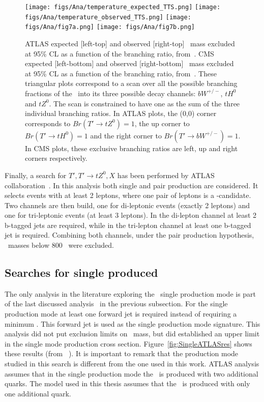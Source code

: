 \begin{figure}[!Hhtbp]
  \begin{center}
    \texttt{[image: figs/Ana/temperature\_expected\_TTS.png]}
    \texttt{[image: figs/Ana/temperature\_observed\_TTS.png]}
    \texttt{[image: figs/Ana/fig7a.png]}
    \texttt{[image: figs/Ana/fig7b.png]}
    \caption{ATLAS expected [left-top] and observed [right-top] \Tp~mass excluded at 95\% CL as a function of the branching ratio, from~\cite{Aad:2015gdg}. CMS expected [left-bottom] and observed [right-bottom] \Tp~mass excluded at 95\% CL as a function of the branching ratio, from~\cite{Chatrchyan:2013uxa}. These triangular plots correspond to a scan over all the possible branching fractions of the \Tp~into its three possible decay channels: $bW^{+/-}$, $tH^{0}$ and $tZ^{0}$. The scan is constrained to have one as the sum of the three individual branching ratios. In ATLAS plots, the (0,0) corner corresponds to ${Br(T'\rightarrow tZ^{0})=1}$, the up corner to ${Br(T'\rightarrow tH^{0})=1}$ and the right corner to ${Br(T'\rightarrow bW^{+/-})=1}$. In CMS plots, these exclusive branching ratios are left, up and right corners respectively.}
    \label{fig:ATLASCMSres}
  \end{center}
\end{figure}

Finally, a search for ${T',T'\rightarrow tZ^{0},X}$ has been performed by ATLAS collaboration~\cite{Aad:2014efa}. In this analysis both single and pair production are considered. It selects events with at least 2 leptons, where one pair of leptons is a \Z-candidate. Two channels are then build, one for di-leptonic events (exactly 2 leptons) and one for tri-leptonic events (at least 3 leptons). In the di-lepton channel at least 2 b-tagged jets are required, while in the tri-lepton channel at least one b-tagged jet is required. Combining both channels, under the pair production hypothesis, \Tp~masses below 800 \GeVcc~were excluded.

\subsection{Searches for single produced \Tp}
\label{sec:singleanal}

The only analysis in the literature exploring the \Tp~single production mode is part of the last discussed analysis~\cite{Aad:2014efa} in the previous subsection. For the single production mode at least one forward jet is required instead of requiring a minimum \HT. This forward jet is used as the single production mode signature. This analysis did not put exclusion limits on \Tp~mass, but did established an upper limit in the single mode production cross section. Figure~\ref{fig:SingleATLASres} shows these results (from ~\cite{Aad:2014efa}). It is important to remark that the production mode studied in this search is different from the one used in this work. ATLAS analysis assumes that in the single production mode the \Tp~is produced with two additional quarks. The model used in this thesis assumes that the \Tp~is produced with only one additional quark.

